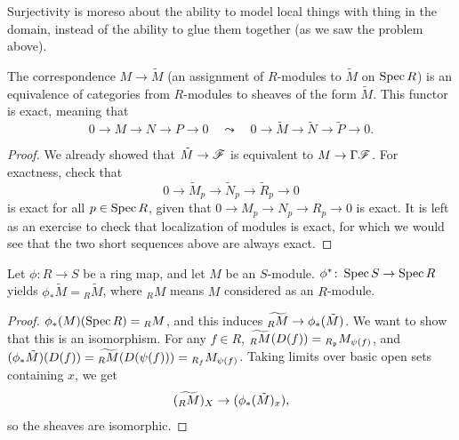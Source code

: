 Surjectivity is moreso about the ability to model local things with thing in the domain, instead of the ability to glue them together (as we saw the problem above).

\begin{theorem} \label{thm:categorical_equivalence_quasicoherent_sheaves}
    The correspondence $M \to \tilde M$ (an assignment of $R$-modules to $\tilde M$ on $\operatorname{Spec} R$) is an equivalence of categories from $R$-modules to sheaves of the form $\tilde M$. This functor is exact, meaning that
    \[ 0 \to M \to N \to P \to 0 \quad \leadsto \quad 0 \to \tilde M \to \tilde N \to \tilde P \to 0. \]
\end{theorem} \vspace{-8pt}
\begin{proof}
    We already showed that $\tilde M \to \mathscr F$ is equivalent to $M \to \Gamma \mathscr F$. For exactness, check that
    \[ 0 \to \tilde M_p \to \tilde N_p \to \tilde R_p \to 0 \]
    is exact for all $p \in \operatorname{Spec} R$, given that $0 \to M_p \to N_p \to R_p \to 0$ is exact. It is left as an exercise to check that localization of modules is exact, for which we would see that the two short sequences above are always exact.
\end{proof}

\begin{theorem} \label{thm:pushforward_of_tilde_modules}
    Let $\phi \colon R \to S$ be a ring map, and let $M$ be an $S$-module. $\phi^\ast \colon \operatorname{Spec} S \to \operatorname{Spec} R$ yields $\phi_\ast \tilde M = {}_R \tilde M$, where ${}_R M$ means $M$ considered as an $R$-module.
\end{theorem}
\begin{proof}
    $\phi_\ast(M)(\operatorname{Spec} R) = {}_R M$, and this induces $\widetilde{{}_R M} \to \phi_\ast(\tilde M)$. We want to show that this is an isomorphism. For any $f \in R$, $\widetilde{{}_R M}(D(f)) = {}_{R_\mathfrak p} M_{\psi(f)}$, and $(\phi_\ast \tilde M)(D(f)) = \widetilde{{}_R M} (D(\psi(f))) = {}_{R_f} M_{\psi(f)}$. Taking limits over basic open sets containing $x$, we get
    \[ (\widetilde{{}_R M})_X \to (\phi_\ast (\tilde M)_x), \]
    so the sheaves are isomorphic.
\end{proof}

